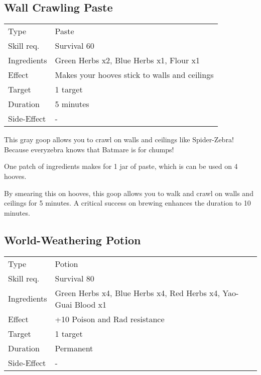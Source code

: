 \documentclass[11pt,a4paper,twocolumn]{book}
\begin{document}
\subsection*{Wall Crawling Paste}
{
	\begin{tabu} to 75mm{| X[l,4] | X[l,8] |}
		\hline
		Type 			& Paste 													\\
		Skill req.	    & Survival 60 												\\
		Ingredients     & Green Herbs x2, Blue Herbs x1, Flour x1					\\
		Effect     		& Makes your hooves stick to walls and ceilings 			\\
		Target      	& 1 target													\\
		Duration  		& 5 minutes	 												\\
		Side-Effect     & -															\\ \hline
	\end{tabu}
	
}

\medskip

This gray goop allows you to crawl on walls and ceilings like Spider-Zebra! Because everyzebra knows that Batmare is for chumps!

One patch of ingredients makes for 1 jar of paste, which is can be used on 4 hooves.

By smearing this on hooves, this goop allows you to walk and crawl on walls and ceilings for 5 minutes. A critical success on brewing enhances the duration to 10 minutes.


\subsection*{World-Weathering Potion}
{
	\begin{tabu} to 75mm{| X[l,4] | X[l,8] |}
		\hline
		Type 			& Potion 															\\
		Skill req.	    & Survival 80 														\\
		Ingredients     & Green Herbs x4, Blue Herbs x4, Red Herbs x4, Yao-Guai Blood x1	\\
		Effect     		& +10 Poison and Rad resistance 							\\
		Target      	& 1 target															\\
		Duration  		& Permanent	 														\\
		Side-Effect     & -																	\\ \hline
	\end{tabu}
	
}
\end{document}
